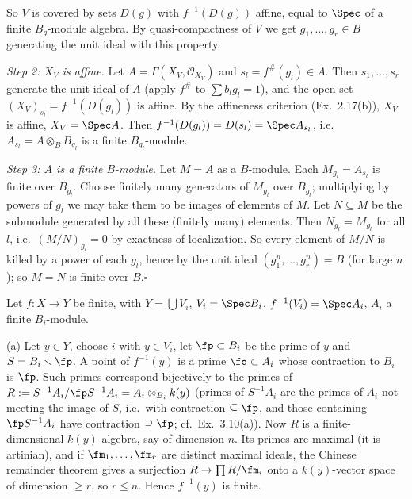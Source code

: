 \documentclass[11pt]{article}
\begin{document}
So $V$ is covered by sets $D(g)$ with $f^{-1}(D(g))$ affine, equal to $\Spec$ of a finite $B_g$-module algebra. By quasi-compactness of $V$ we get $g_1,\dots,g_r\in B$ generating the unit ideal with this property.

\emph{Step 2: $X_V$ is affine.} Let $A=\Gamma(X_V,\mathcal O_{X_V})$ and $s_l=f^\#(g_l)\in A$. Then $s_1,\dots,s_r$ generate the unit ideal of $A$ (apply $f^\#$ to $\sum b_lg_l=1$), and the open set $(X_V)_{s_l}=f^{-1}(D(g_l))$ is affine. By the affineness criterion (Ex.~2.17(b)), $X_V$ is affine, $X_V=\Spec A$. Then $f^{-1}(D(g_l))=D(s_l)=\Spec A_{s_l}$, i.e.\ $A_{s_l}=A\otimes_BB_{g_l}$ is a finite $B_{g_l}$-module.

\emph{Step 3: $A$ is a finite $B$-module.} Let $M=A$ as a $B$-module. Each $M_{g_l}=A_{s_l}$ is finite over $B_{g_l}$. Choose finitely many generators of $M_{g_l}$ over $B_{g_l}$; multiplying by powers of $g_l$ we may take them to be images of elements of $M$. Let $N\subseteq M$ be the submodule generated by all these (finitely many) elements. Then $N_{g_l}=M_{g_l}$ for all $l$, i.e.\ $(M/N)_{g_l}=0$ by exactness of localization. So every element of $M/N$ is killed by a power of each $g_l$, hence by the unit ideal $(g_1^n,\dots,g_r^n)=B$ (for large $n$); so $M=N$ is finite over $B$.\hfill$\square$

\pf
Let $f:X\to Y$ be finite, with $Y=\bigcup V_i$, $V_i=\Spec B_i$, $f^{-1}(V_i)=\Spec A_i$, $A_i$ a finite $B_i$-module.

(a) Let $y\in Y$, choose $i$ with $y\in V_i$, let $\fp\subset B_i$ be the prime of $y$ and $S=B_i\smallsetminus\fp$. A point of $f^{-1}(y)$ is a prime $\fq\subset A_i$ whose contraction to $B_i$ is $\fp$. Such primes correspond bijectively to the primes of $R:=S^{-1}A_i/\fp S^{-1}A_i=A_i\otimes_{B_i}k(y)$ (primes of $S^{-1}A_i$ are the primes of $A_i$ not meeting the image of $S$, i.e.\ with contraction $\subseteq\fp$, and those containing $\fp S^{-1}A_i$ have contraction $\supseteq\fp$; cf.\ Ex.~3.10(a)). Now $R$ is a finite-dimensional $k(y)$-algebra, say of dimension $n$. Its primes are maximal (it is artinian), and if $\fm_1,\dots,\fm_r$ are distinct maximal ideals, the Chinese remainder theorem gives a surjection $R\to\prod R/\fm_i$ onto a $k(y)$-vector space of dimension $\ge r$, so $r\le n$. Hence $f^{-1}(y)$ is finite.
\end{document}
